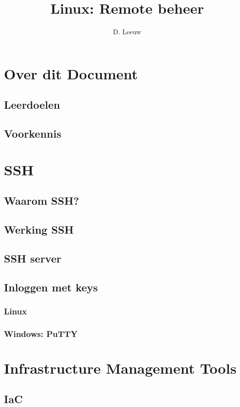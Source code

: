 \documentclass[a4paper,12pt,twoside,openright,titlepage]{article}
\author{D. Leeuw}
\title{Linux: Remote beheer}
\date{\today\\
\vfill
\raggedright
\copyright\ 2026 Dennis Leeuw\\
}
\begin{document}

\maketitle


\section{Over dit Document}
\subsection{Leerdoelen}
%
\subsection{Voorkennis}
%



\section{SSH}

\subsection{Waarom SSH?}

\subsection{Werking SSH}

\subsection{SSH server}

\subsection{Inloggen met keys}
\subsubsection{Linux}

\subsubsection{Windows: PuTTY}


\section{Infrastructure Management Tools}

\subsection{IaC}


\printindex
\end{document}
